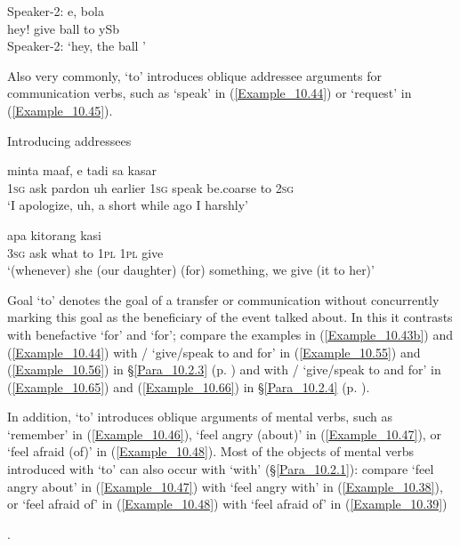 \ex
\label{Example_10.43b}
\gll Speaker-2:  e,    bola    \\
{}     hey!  give  ball  to  ySb\\
\glt Speaker-2: ‘hey,  the ball ’ \textstyleExampleSource{[081011-009-Cv.0015-0016]}
\z
\z


Also very commonly,  ‘to’ introduces oblique addressee arguments for communication verbs, such as  ‘speak’ in (\ref{Example_10.44}) or  ‘request’ in (\ref{Example_10.45}).


\begin{styleExampleTitle}
Introducing addressees
\end{styleExampleTitle}

\ea
\label{Example_10.44}
 {minta} {maaf,} {e} {tadi} {sa} {} {kasar} {} {}\\ %
 \textsc{1sg}  ask  pardon  uh  earlier  \textsc{1sg}  speak  be.coarse  to  \textsc{2sg}\\
\glt 
‘I apologize, uh, a short while ago I  harshly’ \textstyleExampleSource{[081115-001a-Cv.0277]}
\z

\ea
\label{Example_10.45}
 {} {apa} {} {} {kitorang} {kasi}\\ %
 \textsc{3sg}  ask  what  to  \textsc{1pl}  \textsc{1pl}  give\\
\glt 
‘(whenever) she (our daughter)  (for) something, we give (it to her)’ \textstyleExampleSource{[081006-025-CvEx.0022]}
\z


Goal   ‘to’ denotes the goal of a transfer or communication without concurrently marking this goal as the beneficiary of the event talked about. In this it contrasts with benefactive  ‘for’ and  ‘for’; compare the examples in (\ref{Example_10.43b}) and (\ref{Example_10.44}) with / ‘give/speak to and for’ in (\ref{Example_10.55}) and (\ref{Example_10.56}) in §\ref{Para_10.2.3} (p. \pageref{Example_10.56}) and with / ‘give/speak to and for’ in (\ref{Example_10.65}) and (\ref{Example_10.66}) in §\ref{Para_10.2.4} (p. \pageref{Example_10.65}).



In addition,  ‘to’ introduces oblique arguments of mental verbs, such as  ‘remember’ in (\ref{Example_10.46}),  ‘feel angry (about)’ in (\ref{Example_10.47}), or  ‘feel afraid (of)’ in (\ref{Example_10.48}). Most of the objects of mental verbs introduced with  ‘to’ can also occur with   ‘with’ (§\ref{Para_10.2.1}): compare  ‘feel angry about’ in (\ref{Example_10.47}) with  ‘feel angry with’ in (\ref{Example_10.38}), or  ‘feel afraid of’ in (\ref{Example_10.48}) with  ‘feel afraid of’ in (\ref{Example_10.39})\addtocounter{footnote}{-1}\footnotemark{}.

